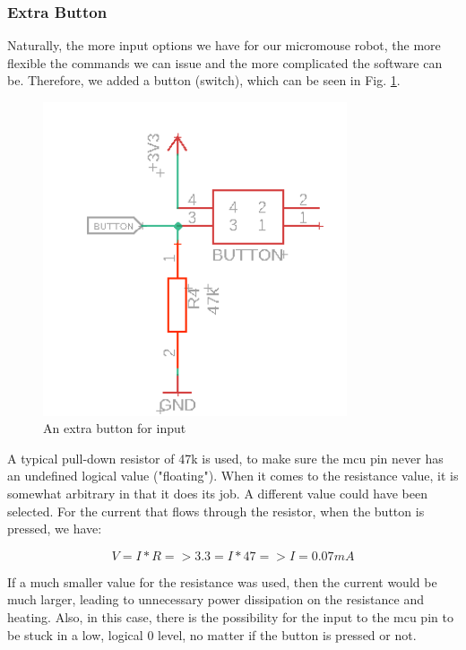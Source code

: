 \vspace{1cm}

\subsubsection{Extra Button}

Naturally, the more input options we have for our micromouse robot, the more flexible the commands we can issue and the more complicated the software can be. Therefore, we added a button (switch), which can be seen in Fig. \ref{fig:button}.

\begin{figure}[htb]
    \centering
    \includegraphics[width=0.8\textwidth]{figures/hardware/Button.PNG}
    \caption{An extra button for input}
    \label{fig:button}
\end{figure}

\FloatBarrier

A typical pull-down resistor of 47k is used, to make sure the mcu pin never has an undefined logical value ("floating"). When it comes to the resistance value, it is somewhat arbitrary in that it does its job. A different value could have been selected.
For the current that flows through the resistor, when the button is pressed, we have:

$$V = I*R => 3.3 = I*47 => I = 0.07mA$$

If a much smaller value for the resistance was used, then the current would be much larger, leading to unnecessary power dissipation on the resistance and heating. Also, in this case, there is the possibility for the input to the mcu pin to be stuck in a low, logical 0 level, no matter if the button is pressed or not.

